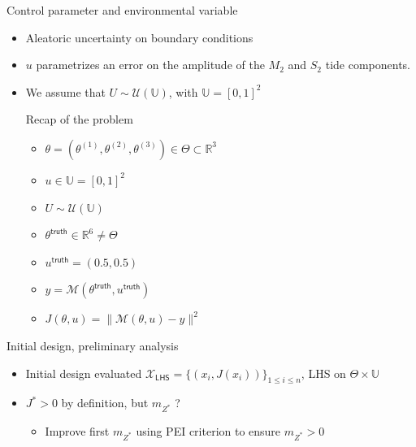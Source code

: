 \documentclass[10pt,aspectratio=169,usepdftitle=false]{beamer}
\newcommand\manupath{/home/victor/acadwriting/Manuscrit/Text/}
\newcommand{\Uspace}{\mathbb{U}}
\newcommand{\Kspace}{\Theta}
\newcommand{\kk}{\theta}
\newcommand{\uu}{u}
\newcommand{\UU}{U}
\begin{document}
\begin{frame}{Control parameter and environmental variable}
  \begin{itemize}
  \item Aleatoric uncertainty on boundary conditions
    \item $\uu$ parametrizes an error on the amplitude of the $M_2$ and
    $S_2$ tide components.
  \item We assume that $\UU \sim \mathcal{U}\left(\Uspace\right)$, with $\Uspace = [0,1]^2$


    \begin{block}{Recap of the problem}
      \begin{itemize}
      \item $\kk = (\kk^{(1)}, \kk^{(2)}, \kk^{(3)})\in \Kspace \subset \mathbb{R}^3$
      \item $\uu \in \Uspace=[0, 1]^2$
      \item $\UU \sim \mathcal{U}\left(\Uspace\right)$
      \end{itemize}
      \begin{itemize}
      \item $\kk^{\mathsf{truth}}\in\mathbb{R}^6 \neq \Kspace$
      \item $\uu^{\mathsf{truth}} = (0.5, 0.5)$
      \item $y=\mathcal{M}(\kk^{\mathsf{truth}}, \uu^{\mathsf{truth}})$
      \item $J(\kk, \uu) = \|\mathcal{M}(\kk, \uu) - y\|^2$
      \end{itemize}
    \end{block}
\end{itemize}


\end{frame}


\begin{frame}{Initial design, preliminary analysis}
\begin{itemize}
\item Initial design evaluated $\mathcal{X}_{\mathsf{LHS}} = \{(x_i, J(x_i))\}_{1 \leq i \leq n}$, LHS on $\Kspace \times \Uspace$
\item $J^*> 0$ by definition, but $m_{Z^*}$ ?
  \begin{itemize}
  \item<2-> Improve first $m_{Z^*}$ using PEI criterion to ensure $m_{Z^*} > 0$
  \end{itemize} 
\end{itemize}
\end{frame}
\end{document}
